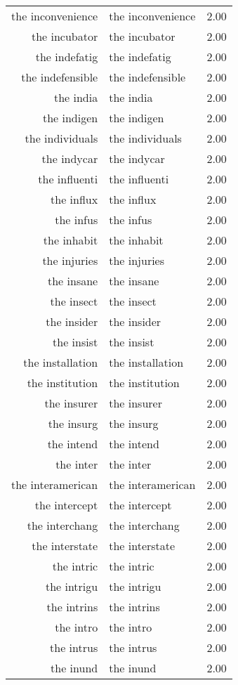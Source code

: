 \begin{table}[ht]
\begin{tabular}{rlr}
  the inconvenience & the inconvenience & 2.00 \\ 
  the incubator & the incubator & 2.00 \\ 
  the indefatig & the indefatig & 2.00 \\ 
  the indefensible & the indefensible & 2.00 \\ 
  the india & the india & 2.00 \\ 
  the indigen & the indigen & 2.00 \\ 
  the individuals & the individuals & 2.00 \\ 
  the indycar & the indycar & 2.00 \\ 
  the influenti & the influenti & 2.00 \\ 
  the influx & the influx & 2.00 \\ 
  the infus & the infus & 2.00 \\ 
  the inhabit & the inhabit & 2.00 \\ 
  the injuries & the injuries & 2.00 \\ 
  the insane & the insane & 2.00 \\ 
  the insect & the insect & 2.00 \\ 
  the insider & the insider & 2.00 \\ 
  the insist & the insist & 2.00 \\ 
  the installation & the installation & 2.00 \\ 
  the institution & the institution & 2.00 \\ 
  the insurer & the insurer & 2.00 \\ 
  the insurg & the insurg & 2.00 \\ 
  the intend & the intend & 2.00 \\ 
  the inter & the inter & 2.00 \\ 
  the interamerican & the interamerican & 2.00 \\ 
  the intercept & the intercept & 2.00 \\ 
  the interchang & the interchang & 2.00 \\ 
  the interstate & the interstate & 2.00 \\ 
  the intric & the intric & 2.00 \\ 
  the intrigu & the intrigu & 2.00 \\ 
  the intrins & the intrins & 2.00 \\ 
  the intro & the intro & 2.00 \\ 
  the intrus & the intrus & 2.00 \\ 
  the inund & the inund & 2.00 \\ 

\end{tabular}
\end{table}
